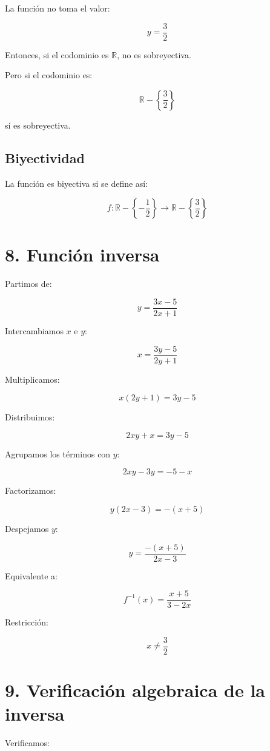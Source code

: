\documentclass[12pt,a4paper]{article}
\begin{document}
	La función no toma el valor:
	
	\[
	y=\frac{3}{2}
	\]
	
	Entonces, si el codominio es $\mathbb{R}$, no es sobreyectiva.
	
	Pero si el codominio es:
	
	\[
	\mathbb{R}-\left\{\frac{3}{2}\right\}
	\]
	
	sí es sobreyectiva.
	
	\subsection*{Biyectividad}
	
	La función es biyectiva si se define así:
	
	\[
	f:\mathbb{R}-\left\{-\frac{1}{2}\right\}\rightarrow \mathbb{R}-\left\{\frac{3}{2}\right\}
	\]
	
	\section*{8. Función inversa}
	
	Partimos de:
	
	\[
	y=\frac{3x-5}{2x+1}
	\]
	
	Intercambiamos $x$ e $y$:
	
	\[
	x=\frac{3y-5}{2y+1}
	\]
	
	Multiplicamos:
	
	\[
	x(2y+1)=3y-5
	\]
	
	Distribuimos:
	
	\[
	2xy+x=3y-5
	\]
	
	Agrupamos los términos con $y$:
	
	\[
	2xy-3y=-5-x
	\]
	
	Factorizamos:
	
	\[
	y(2x-3)=-(x+5)
	\]
	
	Despejamos $y$:
	
	\[
	y=\frac{-(x+5)}{2x-3}
	\]
	
	Equivalente a:
	
	\[
	f^{-1}(x)=\frac{x+5}{3-2x}
	\]
	
	Restricción:
	
	\[
	x\neq \frac{3}{2}
	\]
	
	\section*{9. Verificación algebraica de la inversa}
	
	Verificamos:
	
\end{document}
